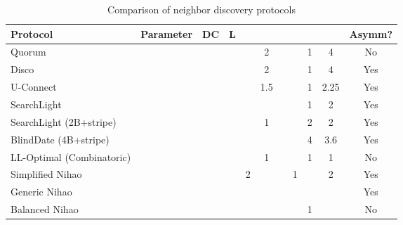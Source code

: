 \documentclass[conference]{IEEEtran}
\begin{document}
\begin{table*}[t]
\centering
\caption{Comparison of neighbor discovery protocols}\label{ndcomparision}
\begin{tabular}{l|c|cccc|cccc|c}
\hline
       Protocol            & Parameter &        DC                   &         L         &                &                      &           &            &&  & Asymm? \\
\hline                                                                                                                                                                                   
                                                                                                                                                                                         
Quorum                     &        &                &              &            & 2                             &            &     & 1      & 4   & No \\ 
Disco                      &  &&          &              & 2                             &       &     & 1      & 4   & Yes \\ 
U-Connect                  &        &               &              &  & 1.5                           &  &    & 1      & 2.25& Yes \\
SearchLight                &        &                &    &              &                     &             &     & 1      & 2   & Yes \\
SearchLight (2B+stripe)    &        &                &    &               & 1                             &             &     & 2      & 2   & Yes \\
BlindDate (4B+stripe)      &        &               &   &   &          &            &   & 4      & 3.6 & Yes \\
LL-Optimal (Combinatoric)  &        &                &              &               & 1                             &             &     & 1      & 1   & No \\
Simplified Nihao           &        &                &                & 2                       &           &             &        1         &     & 2   & Yes \\
Generic Nihao              &      &    &               &            & &             &     &  &  & Yes \\
Balanced Nihao             &        &         &              &            &                     &             &     & 1      &  & No \\

\hline
\end{tabular}
\end{table*}
\end{document}
